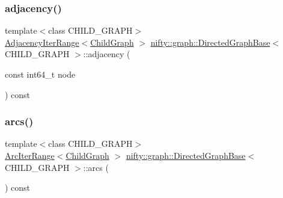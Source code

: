 \subsubsection{\texorpdfstring{adjacency()}{adjacency()}}
{\footnotesize\ttfamily template$<$class C\+H\+I\+L\+D\+\_\+\+G\+R\+A\+PH$>$ \\
\hyperlink{structnifty_1_1graph_1_1DirectedGraphBase_1_1AdjacencyIterRange}{Adjacency\+Iter\+Range}$<$\hyperlink{classnifty_1_1graph_1_1DirectedGraphBase_a583e01641aec296b9bc33a346f90a216}{Child\+Graph} $>$ \hyperlink{classnifty_1_1graph_1_1DirectedGraphBase}{nifty\+::graph\+::\+Directed\+Graph\+Base}$<$ C\+H\+I\+L\+D\+\_\+\+G\+R\+A\+PH $>$\+::adjacency (\begin{DoxyParamCaption}\item[{const int64\+\_\+t}]{node }\end{DoxyParamCaption}) const\hspace{0.3cm}{\ttfamily [inline]}}

\mbox{\label{classnifty_1_1graph_1_1DirectedGraphBase_a6548652bb60a375df4831fc859106018}} 
\subsubsection{\texorpdfstring{arcs()}{arcs()}}
{\footnotesize\ttfamily template$<$class C\+H\+I\+L\+D\+\_\+\+G\+R\+A\+PH$>$ \\
\hyperlink{structnifty_1_1graph_1_1DirectedGraphBase_1_1ArcIterRange}{Arc\+Iter\+Range}$<$\hyperlink{classnifty_1_1graph_1_1DirectedGraphBase_a583e01641aec296b9bc33a346f90a216}{Child\+Graph} $>$ \hyperlink{classnifty_1_1graph_1_1DirectedGraphBase}{nifty\+::graph\+::\+Directed\+Graph\+Base}$<$ C\+H\+I\+L\+D\+\_\+\+G\+R\+A\+PH $>$\+::arcs (\begin{DoxyParamCaption}{ }\end{DoxyParamCaption}) const\hspace{0.3cm}{\ttfamily [inline]}}

\mbox{\label{classnifty_1_1graph_1_1DirectedGraphBase_a34202ef37f7c8fe10469ea4487e96243}} 
